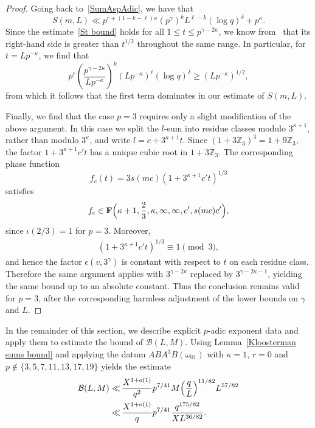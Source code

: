 \documentclass[11pt,reqno]{amsart}
\newcommand{\bna}{\begin{eqnarray*}}
\newcommand{\ena}{\end{eqnarray*}}
\numberwithin{equation}{section}
\theoremstyle{plain}
\theoremstyle{definition}
\begin{document}
\begin{proof}
Going back to~\eqref{SumAspAdic}, we have that
\begin{equation*}
S(m,L) \ll p^{r+(1-k-\ell)\kappa} (p^\gamma)^k  L^{\ell-k} (\log q)^{\delta} + p^\kappa.
\end{equation*}
Since the estimate~\eqref{St bound} holds for all $1 \leq t \leq p^{\gamma-2\kappa}$, 
we know from~\cite[Eq.\,(16)]{MD} that its right-hand side is greater than $t^{1/2}$ throughout the same range. 
In particular, for $t=Lp^{-\kappa}$, we find that
\begin{equation*}
p^r\left(\frac{p^{\gamma-2\kappa}}{Lp^{-\kappa}}\right)^k 
(Lp^{-\kappa})^{\ell}(\log q)^{\delta} \geq (Lp^{-\kappa})^{1/2},
\end{equation*}
from which it follows that the first term dominates in our estimate of $S(m,L)$. 

Finally, we find that the case \(p=3\) requires only a slight modification of the above argument. In this case we split the \(l\)-sum into residue classes modulo
\(3^{\kappa+1}\), rather than modulo \(3^\kappa\), and write $l=c+3^{\kappa+1}t.$
Since $(1+3\mathbb Z_3)^3=1+9\mathbb Z_3,$
the factor \(1+3^{\kappa+1}c't\) has a unique cubic root in
\(1+3\mathbb Z_3\). The corresponding phase function
$$
f_c(t)=3s(mc)\left(1+3^{\kappa+1}c't\right)^{1/3}
$$
satisfies
$$
f_c\in\mathbf F\Bigl(\kappa+1,\frac23,\kappa,\infty,\infty,c',s(mc)c'\Bigr),
$$
since \(\iota(2/3)=1\) for \(p=3\). Moreover,
\bna
(1+3^{\kappa+1}c't)^{1/3}\equiv1\pmod3,
\ena
and hence the factor $\epsilon(v,3^\gamma)$ is constant with respect
to $t$ on each residue class.
Therefore the same argument applies
with \(3^{\gamma-2\kappa}\) replaced by
\(3^{\gamma-2\kappa-1}\), yielding the same bound up to an absolute
constant. Thus the conclusion remains valid for \(p=3\), after the
corresponding harmless adjustment of the lower bounds on \(\gamma\)
and \(L\).
\end{proof}

In the remainder of this section, we describe explicit $p$-adic exponent data and apply them to estimate the bound of $\mathcal{B}(L, M)$.
Using Lemma~\ref{Kloosterman sums bound} and applying the datum $ABA^3B(\omega_{01})$ 
with $\kappa=1$, $r=0$ and $p\not\in\{3,5,7, 11, 13,17,19\}$ yields the estimate
\begin{align}\label{upbound2}
\mathcal{B}(L, M)
\ll &\,\frac{X^{1+o(1)}}{q^2}p^{7/41}M\Bigl(\frac{q}{L}\Bigr)^{11/82}L^{57/82} \nonumber\\
\ll &\, \frac{X^{1+o(1)}}{q}p^{7/41}\frac{q^{175/82}}{XL^{36/82}}.
\end{align}
\end{document}
